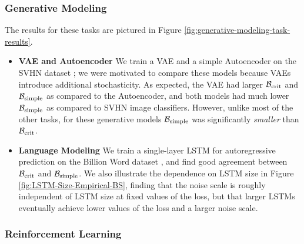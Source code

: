 \documentclass[english]{article}
\newcommand{\CB}{{\cal B}}
\begin{document}
\subsubsection*{Generative Modeling}

The results for  these tasks are pictured in Figure \ref{fig:generative-modeling-task-results}.
\begin{itemize}
\item {\bf VAE and Autoencoder}   We train a VAE  \cite{1312.6114} and a simple Autoencoder on the SVHN dataset \cite{Netzer2011ReadingDI}; we were motivated to compare these models because VAEs introduce additional stochasticity.  As expected, the VAE had larger $\CB_{\rm crit}$ and $\CB_{\rm simple}$ as compared to the Autoencoder, and both models had much lower $\CB_{\rm simple}$ as compared to SVHN image classifiers.  However, unlike most of the other tasks, for these generative models  $\CB_{\rm simple}$ was significantly \emph{smaller} than $\CB_{\rm crit}$.
\item {\bf Language Modeling}   We train a single-layer LSTM for autoregressive prediction on the Billion Word dataset \cite{1312.3005}, and find good agreement between $\CB_{\rm crit}$ and $\CB_{\rm simple}$.   We also illustrate the dependence on LSTM size in Figure \ref{fig:LSTM-Size-Empirical-BS}, finding that the noise scale is roughly independent of LSTM size at fixed values of the loss, but that larger LSTMs eventually achieve lower values of the loss and a larger noise scale.
\end{itemize}

\subsubsection*{Reinforcement Learning}
\end{document}
